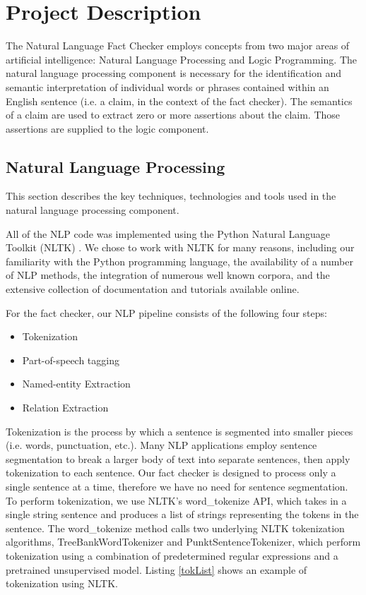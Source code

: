 \documentclass{chi2009}
\begin{document}
\section{Project Description}

The Natural Language Fact Checker employs concepts from two major areas of artificial intelligence: Natural Language Processing and Logic Programming.  The natural language processing component is necessary for the identification and semantic interpretation of individual words or phrases contained within an English sentence (i.e. a claim, in the context of the fact checker).  The semantics of a claim are used to extract zero or more assertions about the claim.  Those assertions are supplied to the logic component.  

\subsection{Natural Language Processing}

This section describes the key techniques, technologies and tools used in the natural language processing component.  

All of the NLP code was implemented using the Python Natural Language Toolkit (NLTK) \cite{nltk}.  We chose to work with NLTK for many reasons, including our familiarity with the Python programming language, the availability of a number of NLP methods, the integration of numerous well known corpora, and the extensive collection of documentation and tutorials available online.
 
For the fact checker, our NLP pipeline consists of the following four steps:

\begin{itemize}
   \item Tokenization
   \item Part-of-speech tagging
   \item Named-entity Extraction
   \item Relation Extraction
\end{itemize}

Tokenization is the process by which a sentence is segmented into smaller pieces (i.e. words, punctuation, etc.).  Many NLP applications employ sentence segmentation to break a larger body of text into separate sentences, then apply tokenization to each sentence.  Our fact checker is designed to process only a single sentence at a time, therefore we have no need for sentence segmentation.  To perform tokenization, we use NLTK's word\_tokenize API, which takes in a single string sentence and produces a list of strings representing the tokens in the sentence.  The word\_tokenize method calls two underlying NLTK tokenization algorithms, TreeBankWordTokenizer and PunktSentenceTokenizer, which perform tokenization using a combination of predetermined regular expressions and a pretrained unsupervised model. Listing \ref{tokList} shows an example of tokenization using NLTK.
\end{document}

